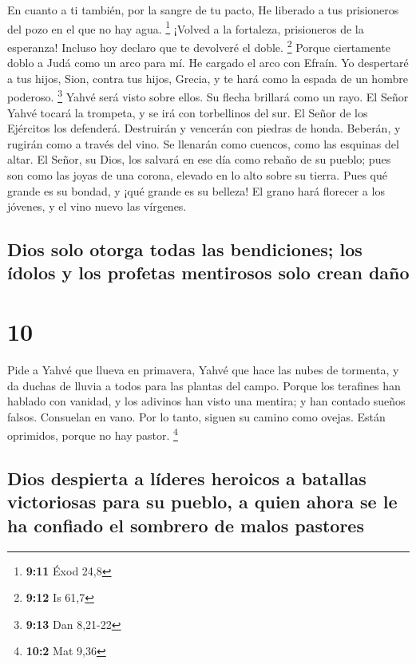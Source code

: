  En cuanto a ti también, por la sangre de tu pacto, He
liberado a tus prisioneros del pozo en el que no hay agua. \footnote{\textbf{9:11}
  Éxod 24,8}  ¡Volved a la fortaleza, prisioneros de la
esperanza! Incluso hoy declaro que te devolveré el doble. \footnote{\textbf{9:12}
  Is 61,7}  Porque ciertamente doblo a Judá como un arco
para mí. He cargado el arco con Efraín. Yo despertaré a tus hijos, Sion,
contra tus hijos, Grecia, y te hará como la espada de un hombre
poderoso. \footnote{\textbf{9:13} Dan 8,21-22}  Yahvé
será visto sobre ellos. Su flecha brillará como un rayo. El Señor Yahvé
tocará la trompeta, y se irá con torbellinos del sur.  El
Señor de los Ejércitos los defenderá. Destruirán y vencerán con piedras
de honda. Beberán, y rugirán como a través del vino. Se llenarán como
cuencos, como las esquinas del altar.  El Señor, su Dios,
los salvará en ese día como rebaño de su pueblo; pues son como las joyas
de una corona, elevado en lo alto sobre su tierra.  Pues
qué grande es su bondad, y ¡qué grande es su belleza! El grano hará
florecer a los jóvenes, y el vino nuevo las vírgenes.

\hypertarget{dios-solo-otorga-todas-las-bendiciones-los-uxeddolos-y-los-profetas-mentirosos-solo-crean-dauxf1o}{%
\subsection{Dios solo otorga todas las bendiciones; los ídolos y los
profetas mentirosos solo crean
daño}\label{dios-solo-otorga-todas-las-bendiciones-los-uxeddolos-y-los-profetas-mentirosos-solo-crean-dauxf1o}}

\hypertarget{section-9}{%
\section{10}\label{section-9}}

 Pide a Yahvé que llueva en primavera, Yahvé que hace las
nubes de tormenta, y da duchas de lluvia a todos para las plantas del
campo.  Porque los terafines han hablado con vanidad, y
los adivinos han visto una mentira; y han contado sueños falsos.
Consuelan en vano. Por lo tanto, siguen su camino como ovejas. Están
oprimidos, porque no hay pastor. \footnote{\textbf{10:2} Mat 9,36}

\hypertarget{dios-despierta-a-luxedderes-heroicos-a-batallas-victoriosas-para-su-pueblo-a-quien-ahora-se-le-ha-confiado-el-sombrero-de-malos-pastores}{%
\subsection{Dios despierta a líderes heroicos a batallas victoriosas
para su pueblo, a quien ahora se le ha confiado el sombrero de malos
pastores}\label{dios-despierta-a-luxedderes-heroicos-a-batallas-victoriosas-para-su-pueblo-a-quien-ahora-se-le-ha-confiado-el-sombrero-de-malos-pastores}}

